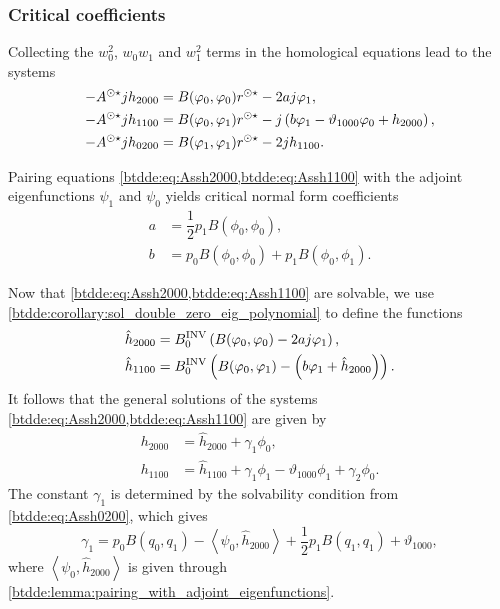 \subsubsection{Critical coefficients}
\label{btdde:sec:critical_coefficients}
Collecting the $w_0^2$, $w_0w_1$ and $w_1^2$ terms in the homological equations
lead to the systems
\begin{align}
-A^{\odot\star} jh_{2000} & =  B(\varphi_0,\varphi_0)r^{\odot\star} - 2aj\varphi_1 , \label{btdde:eq:Assh2000}\\
-A^{\odot\star} jh_{1100} & =  B(\varphi_0,\varphi_1)r^{\odot\star} - j\left(b\varphi_1 - \vartheta_{1000} \varphi_0 + h_{2000}\right), \label{btdde:eq:Assh1100} \\
-A^{\odot\star} jh_{0200} & =  B(\varphi_1,\varphi_1)r^{\odot\star} - 2j h_{1100}. \label{btdde:eq:Assh0200}
\end{align}

Pairing equations \cref{btdde:eq:Assh2000,btdde:eq:Assh1100} with the adjoint
eigenfunctions $\psi_1$ and $\psi_0$ yields critical normal form coefficients
\begin{align*}
a & = \dfrac{1}{2}p_1B(\phi_0,\phi_0),\\
b & = p_0B(\phi_0,\phi_0) + p_1B(\phi_0,\phi_1).
\end{align*}

Now that \cref{btdde:eq:Assh2000,btdde:eq:Assh1100} are solvable, we use
\cref{btdde:corollary:sol_double_zero_eig_polynomial} to define the functions
\begin{align*}
\hat h_{2000} & = B^{\mathrm{INV}}_{0} \left( B(\varphi_0,\varphi_0) - 2aj\varphi_1 \right), \\
\hat h_{1100} & = B^{\mathrm{INV}}_{0} \left( B(\varphi_0,\varphi_1) - \left(b\varphi_1 + \hat h_{2000}\right) \right).
\end{align*}
It follows that the general solutions of the systems \cref{btdde:eq:Assh2000,btdde:eq:Assh1100}
are given by
\begin{align*}
h_{2000} &= \hat h_{2000} + \gamma_1 \phi_0, \\
h_{1100} &= \hat h_{1100} + \gamma_1 \phi_1 - \vartheta_{1000} \phi_1 + \gamma_2 \phi_0.
\end{align*}
The constant $\gamma_1$ is determined by the solvability condition from \cref{btdde:eq:Assh0200}, which gives
\begin{equation*}
\gamma_1 = p_0  B(q_0,q_1) - \left< \psi_0, \hat h_{2000} \right> 
								+ \frac12 p_1 B(q_1,q_1) + \vartheta_{1000},
\end{equation*}
where $\left< \psi_0,\hat h_{2000}\right>$ is given through \cref{btdde:lemma:pairing_with_adjoint_eigenfunctions}.

